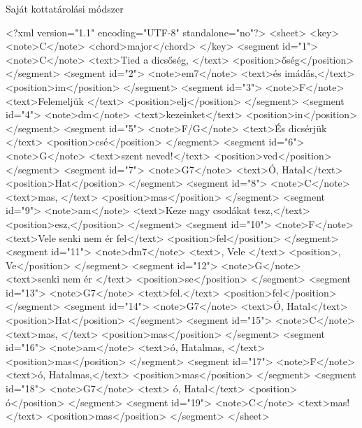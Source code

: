 \begin{large}
	Saját kottatárolási módszer
\end{large}
\begin{xml}
<?xml version="1.1" encoding="UTF-8" standalone="no"?>
  <sheet>
    <key>
      <note>C</note>
      <chord>major</chord>
    </key>
    <segment id="1">
      <note>C</note>
      <text>Tied a dicsőség, </text>
      <position>őség</position>
    </segment>
    <segment id="2">
      <note>em7</note>
      <text>és imádás,\n</text>
      <position>im</position>
    </segment>
    <segment id="3">
      <note>F</note>
      <text>Felemeljük </text>
      <position>elj</position>
    </segment>
    <segment id="4">
      <note>dm</note>
      <text>kezeinket\n</text>
      <position>in</position>
    </segment>
    <segment id="5">
      <note>F/G</note>
      <text>És dicsérjük </text>
      <position>csé</position>
    </segment>
    <segment id="6">
      <note>G</note>
      <text>szent neved!\n</text>
      <position>ved</position>
    </segment>
    <segment id="7">
      <note>G7</note>
      <text>Ó, Hatal</text>
      <position>Hat</position>
    </segment>
    <segment id="8">
      <note>C</note>
      <text>mas, </text>
      <position>mas</position>
    </segment>
    <segment id="9">
      <note>am</note>
      <text>Keze nagy csodákat tesz,\n</text>
      <position>esz,</position>
    </segment>
    <segment id="10">
      <note>F</note>
      <text>Vele senki nem ér fel</text>
      <position>fel</position>
    </segment>
    <segment id="11">
      <note>dm7</note>
      <text>, Vele </text>
      <position>, Ve</position>
    </segment>
    <segment id="12">
      <note>G</note>
      <text>senki nem ér </text>
      <position>se</position>
    </segment>
    <segment id="13">
      <note>G7</note>
      <text>fel.\n</text>
      <position>fel</position>
    </segment>
    <segment id="14">
      <note>G7</note>
      <text>Ó, Hatal</text>
      <position>Hat</position>
    </segment>
    <segment id="15">
      <note>C</note>
      <text>mas, </text>
      <position>mas</position>
    </segment>
    <segment id="16">
      <note>am</note>
      <text>ó, Hatalmas, </text>
      <position>mas</position>
    </segment>
    <segment id="17">
      <note>F</note>
      <text>ó, Hatalmas,</text>
      <position>mas</position>
    </segment>
    <segment id="18">
      <note>G7</note>
      <text> ó, Hatal</text>
      <position> ó</position>
    </segment>
    <segment id="19">
      <note>C</note>
      <text>mas!</text>
      <position>mas</position>
    </segment>
  </sheet>

\end{xml}

